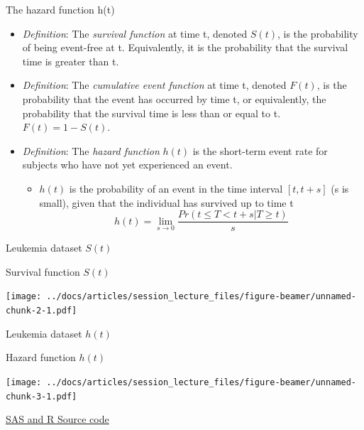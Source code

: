 \documentclass[
  ignorenonframetext,
]{beamer}
\providecommand{\tightlist}{%
  \setlength{\itemsep}{0pt}\setlength{\parskip}{0pt}}
\begin{document}
\begin{frame}{The hazard function h(t)}
\protect\hypertarget{the-hazard-function-ht}{}

\begin{itemize}
\item
  \emph{Definition}: The \emph{survival function} at time t, denoted
  \(S(t)\), is the probability of being event-free at t. Equivalently,
  it is the probability that the survival time is greater than t.
\item
  \emph{Definition}: The \emph{cumulative event function} at time t,
  denoted \(F(t)\), is the probability that the event has occurred by
  time t, or equivalently, the probability that the survival time is
  less than or equal to t. \(F(t) = 1-S(t)\).
\item
  \emph{Definition}: The \emph{hazard function} \(h(t)\) is the
  short-term event rate for subjects who have not yet experienced an
  event.

  \begin{itemize}
  \tightlist
  \item
    \(h(t)\) is the probability of an event in the time interval
    \([t, t+s]\) (s is small), given that the individual has survived up
    to time t
    \[h(t) = \lim_{s \to 0} \frac{Pr(t \leq T < t+s | T \ge t)}{s}\]
  \end{itemize}
\end{itemize}

\end{frame}

\begin{frame}{Leukemia dataset \(S(t)\)}
\protect\hypertarget{leukemia-dataset-st}{}

Survival function \(S(t)\)

\texttt{[image: ../docs/articles/session\_lecture\_files/figure-beamer/unnamed-chunk-2-1.pdf]}

\end{frame}

\begin{frame}{Leukemia dataset \(h(t)\)}
\protect\hypertarget{leukemia-dataset-ht}{}

Hazard function \(h(t)\)

\texttt{[image: ../docs/articles/session\_lecture\_files/figure-beamer/unnamed-chunk-3-1.pdf]}

\footnotesize

\href{http://sas-and-r.blogspot.com/2010/06/example-741-hazard-function-plotting.html}{SAS
and R Source code}

\end{frame}
\end{document}
